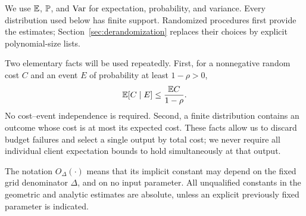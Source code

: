We use \(\mathbb E\), \(\mathbb P\), and \(\operatorname{Var}\) for expectation, probability, and variance.
Every distribution used below has finite support. Randomized procedures
first provide the estimates; Section~\ref{sec:derandomization} replaces their
choices by explicit polynomial-size lists.

Two elementary facts will be used repeatedly. First, for a nonnegative random
cost \(C\) and an event \(E\) of probability at least \(1-\rho>0\),
\begin{equation}\label{eq:conditioning}
 \mathbb E[C\mid E]\le\frac{\mathbb E C}{1-\rho}.
\end{equation}
No cost--event independence is required. Second, a finite distribution
contains an outcome whose cost is at most its expected cost. These facts
allow us to discard budget failures and select a single output by total
cost; we never require all individual client expectation bounds to hold
simultaneously at that output.

The notation \(O_\Delta(\cdot)\) means that its implicit constant may depend
on the fixed grid denominator \(\Delta\), and on no input parameter.
All unqualified constants in the geometric and analytic estimates are
absolute, unless an explicit previously fixed parameter is indicated.
